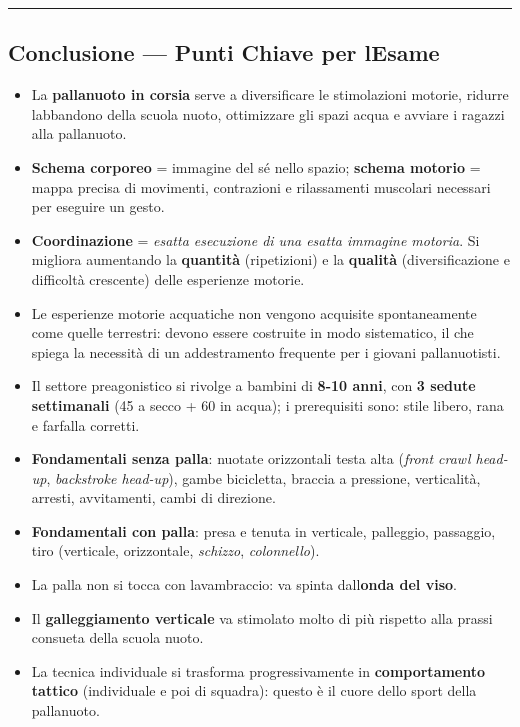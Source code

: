 \documentclass[a4paper,11pt]{article}
\providecommand{\tightlist}{%
  \setlength{\itemsep}{0pt}\setlength{\parskip}{0pt}}
\begin{document}
\begin{center}\rule{0.5\linewidth}{0.5pt}\end{center}

\subsection{Conclusione --- Punti Chiave per
      l\textquotesingle Esame}\label{conclusione-punti-chiave-per-lesame-9}

\begin{itemize}
      \tightlist
      \item
            La \textbf{pallanuoto in corsia} serve a diversificare le stimolazioni
            motorie, ridurre l\textquotesingle abbandono della scuola nuoto,
            ottimizzare gli spazi acqua e avviare i ragazzi alla pallanuoto.
      \item
            \textbf{Schema corporeo} = immagine del sé nello spazio;
            \textbf{schema motorio} = mappa precisa di movimenti, contrazioni e
            rilassamenti muscolari necessari per eseguire un gesto.
      \item
            \textbf{Coordinazione} = \emph{esatta esecuzione di una esatta
                  immagine motoria}. Si migliora aumentando la \textbf{quantità}
            (ripetizioni) e la \textbf{qualità} (diversificazione e difficoltà
            crescente) delle esperienze motorie.
      \item
            Le esperienze motorie acquatiche non vengono acquisite spontaneamente
            come quelle terrestri: devono essere costruite in modo sistematico, il
            che spiega la necessità di un addestramento frequente per i giovani
            pallanuotisti.
      \item
            Il settore preagonistico si rivolge a bambini di \textbf{8-10 anni},
            con \textbf{3 sedute settimanali} (45\textquotesingle{} a secco +
            60\textquotesingle{} in acqua); i prerequisiti sono: stile libero,
            rana e farfalla corretti.
      \item
            \textbf{Fondamentali senza palla}: nuotate orizzontali testa alta
            (\emph{front crawl head-up}, \emph{backstroke head-up}), gambe
            bicicletta, braccia a pressione, verticalità, arresti, avvitamenti,
            cambi di direzione.
      \item
            \textbf{Fondamentali con palla}: presa e tenuta in verticale,
            palleggio, passaggio, tiro (verticale, orizzontale, \emph{schizzo},
            \emph{colonnello}).
      \item
            La palla non si tocca con l\textquotesingle avambraccio: va spinta
            dall\textquotesingle{}\textbf{onda del viso}.
      \item
            Il \textbf{galleggiamento verticale} va stimolato molto di più
            rispetto alla prassi consueta della scuola nuoto.
      \item
            La tecnica individuale si trasforma progressivamente in
            \textbf{comportamento tattico} (individuale e poi di squadra): questo
            è il cuore dello sport della pallanuoto.
\end{itemize}
\end{document}
